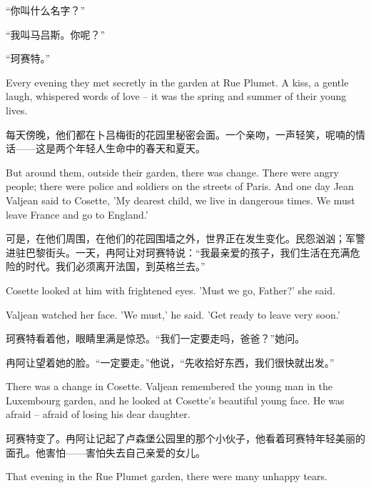 \documentclass[fontset=ubuntu, zihao=5]{ctexart}
\begin{document}
\begin{paracol}{2}
“你叫什么名字？”

“我叫马吕斯。你呢？”

“珂赛特。”


\switchcolumn*

\sectionbreak

Every evening they met secretly in the garden at Rue Plumet. A kiss, a gentle laugh, whispered words of love – it was the spring and summer of their young lives.

\switchcolumn

\sectionbreak

每天傍晚，他们都在卜吕梅街的花园里秘密会面。一个亲吻，一声轻笑，呢喃的情话——这是两个年轻人生命中的春天和夏天。

\switchcolumn*

But around them, outside their garden, there was change. There were angry people; there were police and soldiers on the streets of Paris. And one day Jean Valjean said to Cosette, 'My dearest child, we live in dangerous times. We must leave France and go to England.'

\switchcolumn

可是，在他们周围，在他们的花园围墙之外，世界正在发生变化。民怨汹汹；军警进驻巴黎街头。一天，冉阿让对珂赛特说：“我最亲爱的孩子，我们生活在充满危险的时代。我们必须离开法国，到英格兰去。”

\switchcolumn*

Cosette looked at him with frightened eyes. 'Must we go, Father?' she said.


Valjean watched her face. 'We must,' he said. 'Get ready to leave very soon.'

\switchcolumn

珂赛特看着他，眼睛里满是惊恐。“我们一定要走吗，爸爸？”她问。

冉阿让望着她的脸。“一定要走。”他说，“先收拾好东西，我们很快就出发。”

\switchcolumn*

There was a change in Cosette. Valjean remembered the young man in the Luxembourg garden, and he looked at Cosette's beautiful young face. He was afraid – afraid of losing his dear daughter.

\switchcolumn

珂赛特变了。冉阿让记起了卢森堡公园里的那个小伙子，他看着珂赛特年轻美丽的面孔。他害怕——害怕失去自己亲爱的女儿。

\switchcolumn*

\sectionbreak

That evening in the Rue Plumet garden, there were many unhappy tears.


\end{paracol}
\end{document}
